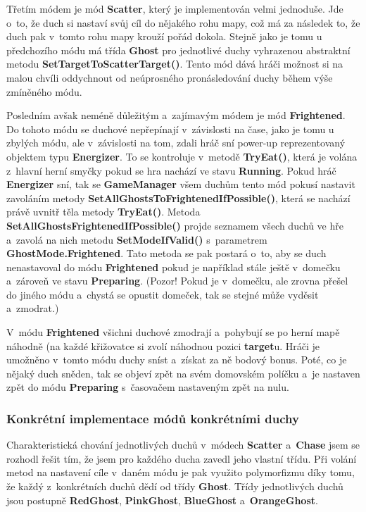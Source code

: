 \documentclass{article}
\begin{document}
Třetím módem je mód \textbf{Scatter}, který je implementován velmi jednoduše. Jde o~to, že duch si nastaví svůj cíl do nějakého rohu mapy, což má za následek to, že duch pak v~tomto rohu mapy krouží pořád dokola. Stejně jako je tomu u předchozího módu má třída \textbf{Ghost} pro jednotlivé duchy vyhrazenou abstraktní metodu \textbf{SetTargetToScatterTarget()}. Tento mód dává hráči možnost si na malou chvíli oddychnout od neúprosného pronásledování duchy během výše zmíněného módu.

Posledním avšak neméně důležitým a~zajímavým módem je mód \textbf{Frightened}. Do tohoto módu se duchové nepřepínají v~závislosti na čase, jako je tomu u zbylých módu, ale v~závislosti na tom, zdali hráč sní power-up reprezentovaný objektem typu \textbf{Energizer}. To se kontroluje v~metodě \textbf{TryEat()}, která je volána z~hlavní herní smyčky pokud se hra nachází ve stavu \textbf{Running}. Pokud hráč \textbf{Energizer} sní, tak se \textbf{GameManager} všem duchům tento mód pokusí nastavit zavoláním metody \textbf{SetAllGhostsToFrightenedIfPossible()}, která se nachází právě uvnitř těla metody \textbf{TryEat()}. Metoda \textbf{SetAllGhostsFrightenedIfPossible()} projde seznamem všech duchů ve hře a~zavolá na nich metodu \textbf{SetModeIfValid()} s~parametrem \textbf{GhostMode.Frightened}. Tato metoda se pak postará o~to, aby se duch nenastavoval do módu \textbf{Frightened} pokud je například stále ještě v~domečku a~zároveň ve stavu \textbf{Preparing}. (Pozor! Pokud je v~domečku, ale zrovna přešel do jiného módu a~chystá se opustit domeček, tak se stejné může vyděsit a~zmodrat.)

V~módu \textbf{Frightened} všichni duchové zmodrají a~pohybují se po herní mapě náhodně (na každé křižovatce si zvolí náhodnou pozici \textbf{target}u. Hráči je umožněno v~tomto módu duchy sníst a~získat za ně bodový bonus. Poté, co je nějaký duch sněden, tak se objeví zpět na svém domovském políčku a~je nastaven zpět do módu \textbf{Preparing} s~časovačem nastaveným zpět na nulu.

\subsubsection{Konkrétní implementace módů konkrétními duchy} \label{concretemodes}
Charakteristická chování jednotlivých duchů v~módech \textbf{Scatter} a~\textbf{Chase} jsem se rozhodl řešit tím, že jsem pro každého ducha zavedl jeho vlastní třídu. Při volání metod na nastavení cíle v~daném módu je pak využito polymorfizmu díky tomu, že každý z~konkrétních duchů dědí od třídy \textbf{Ghost}. Třídy jednotlivých duchů jsou postupně \textbf{RedGhost}, \textbf{PinkGhost}, \textbf{BlueGhost} a~\textbf{OrangeGhost}. 
\end{document}
